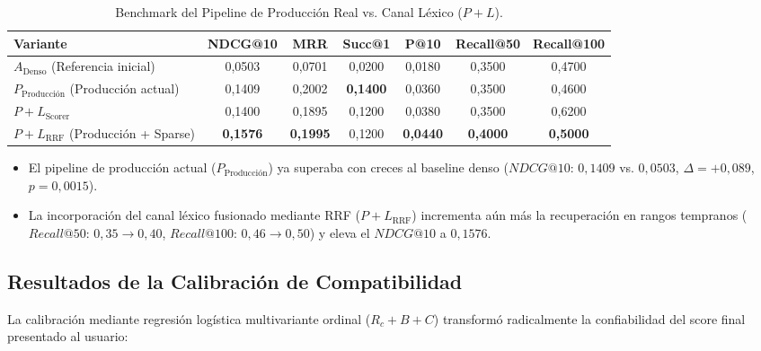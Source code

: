 \documentclass[11pt,a4paper]{article}
\begin{document}
\begin{table}[htbp]
\centering
\small
\caption{Benchmark del Pipeline de Producción Real vs. Canal Léxico ($P+L$).}
\label{tab:prod_lexico}
\begin{tabularx}{\textwidth}{lcccccc}
\toprule
\textbf{Variante} & \textbf{NDCG@10} & \textbf{MRR} & \textbf{Succ@1} & \textbf{P@10} & \textbf{Recall@50} & \textbf{Recall@100} \\
\midrule
$A_{\text{Denso}}$ (Referencia inicial) & 0{,}0503 & 0{,}0701 & 0{,}0200 & 0{,}0180 & 0{,}3500 & 0{,}4700 \\
$P_{\text{Producción}}$ (Producción actual) & 0{,}1409 & 0{,}2002 & \textbf{0{,}1400} & 0{,}0360 & 0{,}3500 & 0{,}4600 \\
$P+L_{\text{Scorer}}$ & 0{,}1400 & 0{,}1895 & 0{,}1200 & 0{,}0380 & 0{,}3500 & 0{,}6200 \\
$P+L_{\text{RRF}}$ (Producción + Sparse) & \textbf{0{,}1576} & \textbf{0{,}1995} & 0{,}1200 & \textbf{0{,}0440} & \textbf{0{,}4000} & \textbf{0{,}5000} \\
\bottomrule
\end{tabularx}
\end{table}

\begin{itemize}[leftmargin=*]
    \item El pipeline de producción actual ($P_{\text{Producción}}$) ya superaba con creces al baseline denso ($NDCG@10$: $0{,}1409$ vs. $0{,}0503$, $\Delta = +0{,}089$, $p=0{,}0015$).
    \item La incorporación del canal léxico fusionado mediante RRF ($P+L_{\text{RRF}}$) incrementa aún más la recuperación en rangos tempranos ($Recall@50$: $0{,}35 \to 0{,}40$, $Recall@100$: $0{,}46 \to 0{,}50$) y eleva el $NDCG@10$ a $0{,}1576$.
\end{itemize}

\subsection{Resultados de la Calibración de Compatibilidad}
La calibración mediante regresión logística multivariante ordinal ($R_c + B + C$) transformó radicalmente la confiabilidad del score final presentado al usuario:
\end{document}
